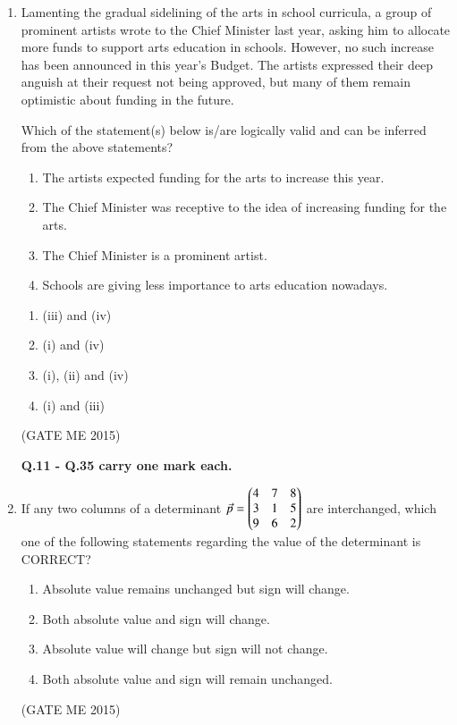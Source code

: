 \documentclass[journal]{IEEEtran}
\begin{document}
\begin{enumerate}
\item Lamenting the gradual sidelining of the arts in school curricula, a group of prominent artists wrote to the Chief Minister last year, asking him to allocate more funds to support arts education in schools. However, no such increase has been announced in this year's Budget. The artists expressed their deep anguish at their request not being approved, but many of them remain optimistic about funding in the future.

Which of the statement(s) below is/are logically valid and can be inferred from the above statements?

\begin{enumerate}[label=(\roman*)]
\item The artists expected funding for the arts to increase this year.  
\item The Chief Minister was receptive to the idea of increasing funding for the arts.  
\item The Chief Minister is a prominent artist.  
\item Schools are giving less importance to arts education nowadays.  
\end{enumerate}

\begin{multicols}{2}
\begin{enumerate}
\item (iii) and (iv)  
\item (i) and (iv)  
\item (i), (ii) and (iv)  
\item (i) and (iii)  
\end{enumerate}
\end{multicols}
\hfill  (GATE ME 2015)

\textbf{Q.11 - Q.35 carry one mark each.}

\item If any two columns of a determinant 
$\Vec{p} = \begin{pmatrix}4 & 7 & 8 \\
                  3 & 1 & 5 \\
                  9 & 6 & 2 \end{pmatrix}$
are interchanged, which one of the following statements regarding the value of the determinant is CORRECT?
\begin{enumerate}
\item Absolute value remains unchanged but sign will change.  
\item Both absolute value and sign will change.  
\item Absolute value will change but sign will not change.  
\item Both absolute value and sign will remain unchanged.  
\end{enumerate}
\hfill  (GATE ME 2015)


\end{enumerate}
\end{document}
